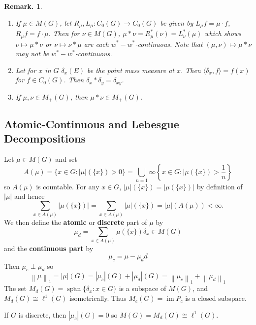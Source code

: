 \documentclass[11pt, a4paper]{memoir}
\newcommand{\norm}[1]{\ensuremath{\left\lVert#1\right\rVert}}
\theoremstyle{change}
\theoremstyle{plain}
\theoremstyle{nonumberplain}
\newtheorem{remark}{Remark.}
\DeclareMathOperator{\im}{im}
\DeclareMathOperator{\spn}{span}
\newcommand{\defn}[1]{{\boldmath\bfseries #1}}
\numberwithin{equation}{section}
\begin{document}
\begin{remark}
    \begin{enumerate}[nl,r]
        \item If $\mu\in M(G)$, let $R_\mu,L_\mu:C_0(G)\to C_0(G)$ be given by $L_\mu f=\mu\cdot f$, $R_\mu f=f\cdot\mu$.
            Then for $\nu\in M(G)$, $\mu*\nu=R_\mu^*(\nu)=L_\nu^*(\mu)$ which shows $\nu\mapsto\mu*\nu$ or $\nu\mapsto\nu*\mu$ are each $w^*-w^*$-continuous.
            Note that $(\mu,\nu)\mapsto \mu*\nu$ may not be $w^*-w^*$-continuous.
        \item Let for $x$ in $G$ $\delta_x(E)$ be the point mass measure at $x$.
            Then $\langle\delta_x,f\rangle=f(x)$ for $f\in C_0(G)$.
            Then $\delta_x*\delta_y=\delta_{xy}$.
        \item If $\mu,\nu\in M_+(G)$, then $\mu*\nu\in M_+(G)$.
    \end{enumerate}
\end{remark}
\subsection{Atomic-Continuous and Lebesgue Decompositions}
Let $\mu\in M(G)$ and set
\begin{equation*}
    A(\mu) = \{x\in G:|\mu|(\{x\})>0\}=\bigcup_{n=1}\infty\left\{x\in G:|\mu(\{x\})>\frac{1}{n}\right\}
\end{equation*}
so $A(\mu)$ is countable.
For any $x\in G$, $|\mu|(\{x\})=|\mu(\{x\})|$ by definition of $|\mu|$ and hence
\begin{equation*}
    \sum_{x\in A(\mu)}|\mu(\{x\})|=\sum_{x\in A(\mu)}|\mu|(\{x\})=|\mu|(A(\mu))<\infty.
\end{equation*}
We then define the \defn{atomic} or \defn{discrete} part of $\mu$ by
\begin{equation*}
    \mu_d=\sum_{x\in A(\mu)}\mu(\{x\})\delta_x\in M(G)
\end{equation*}
and the \defn{continuous part} by
\begin{equation*}
    \mu_c=\mu-\mu_dd
\end{equation*}
Then $\mu_c\perp\mu_d$ so
\begin{equation*}
    \norm{\mu}_1=|\mu|(G)=|\mu_c|(G)+|\mu_d|(G)=\norm{\mu_c}_1+\norm{\mu_d}_1
\end{equation*}
The set $M_d(G)=\overline{\spn}\{\delta_x:x\in G\}$ is a subspace of $M(G)$, and $M_d(G)\cong\ell^1(G)$ isometrically.
Thus $M_c(G)=\im P_c$ is a closed subspace.

If $G$ is discrete, then $|\mu_c|(G)=0$ so $M(G)=M_d(G)\cong\ell^1(G)$.
\end{document}
